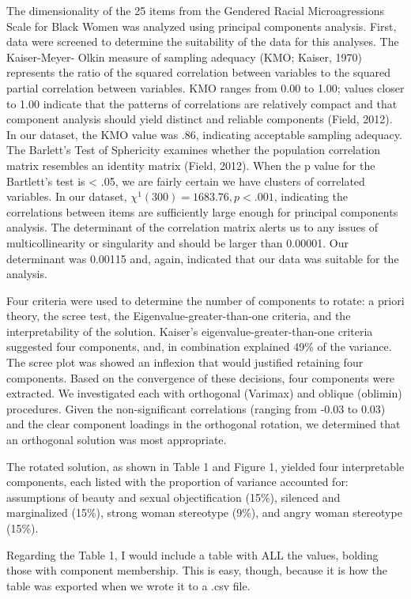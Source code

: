 \documentclass[
  english,
]{book}
\begin{document}
The dimensionality of the 25 items from the Gendered Racial Microagressions Scale for Black Women was analyzed using principal components analysis. First, data were screened to determine the suitability of the data for this analyses. The Kaiser-Meyer- Olkin measure of sampling adequacy (KMO; Kaiser, 1970) represents the ratio of the squared correlation between variables to the squared partial correlation between variables. KMO ranges from 0.00 to 1.00; values closer to 1.00 indicate that the patterns of correlations are relatively compact and that component analysis should yield distinct and reliable components (Field, 2012). In our dataset, the KMO value was .86, indicating acceptable sampling adequacy. The Barlett's Test of Sphericity examines whether the population correlation matrix resembles an identity matrix (Field, 2012). When the p value for the Bartlett's test is \textless{} .05, we are fairly certain we have clusters of correlated variables. In our dataset, \(\chi ^{1}(300)=1683.76, p < .001\), indicating the correlations between items are sufficiently large enough for principal components analysis. The determinant of the correlation matrix alerts us to any issues of multicollinearity or singularity and should be larger than 0.00001. Our determinant was 0.00115 and, again, indicated that our data was suitable for the analysis.

Four criteria were used to determine the number of components to rotate: a priori theory, the scree test, the Eigenvalue-greater-than-one criteria, and the interpretability of the solution. Kaiser's eigenvalue-greater-than-one criteria suggested four components, and, in combination explained 49\% of the variance. The scree plot was showed an inflexion that would justified retaining four components. Based on the convergence of these decisions, four components were extracted. We investigated each with orthogonal (Varimax) and oblique (oblimin) procedures. Given the non-significant correlations (ranging from -0.03 to 0.03) and the clear component loadings in the orthogonal rotation, we determined that an orthogonal solution was most appropriate.

The rotated solution, as shown in Table 1 and Figure 1, yielded four interpretable components, each listed with the proportion of variance accounted for: assumptions of beauty and sexual objectification (15\%), silenced and marginalized (15\%), strong woman stereotype (9\%), and angry woman stereotype (15\%).

Regarding the Table 1, I would include a table with ALL the values, bolding those with component membership. This is easy, though, because it is how the table was exported when we wrote it to a .csv file.
\end{document}
